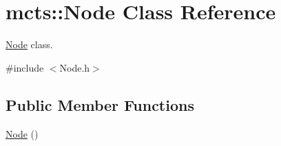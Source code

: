 \hypertarget{classmcts_1_1_node}{\section{mcts\+:\+:Node Class Reference}
\label{classmcts_1_1_node}
}


\hyperlink{classmcts_1_1_node}{Node} class.  




{\ttfamily \#include $<$Node.\+h$>$}

\subsection*{Public Member Functions}
\begin{DoxyCompactItemize}
\item 
\hypertarget{classmcts_1_1_node_a5fb90d28e126f4e432b2cc3721bd357a}{\hyperlink{classmcts_1_1_node_a5fb90d28e126f4e432b2cc3721bd357a}{Node} ()}\label{classmcts_1_1_node_a5fb90d28e126f4e432b2cc3721bd357a}


\end{DoxyCompactItemize}

